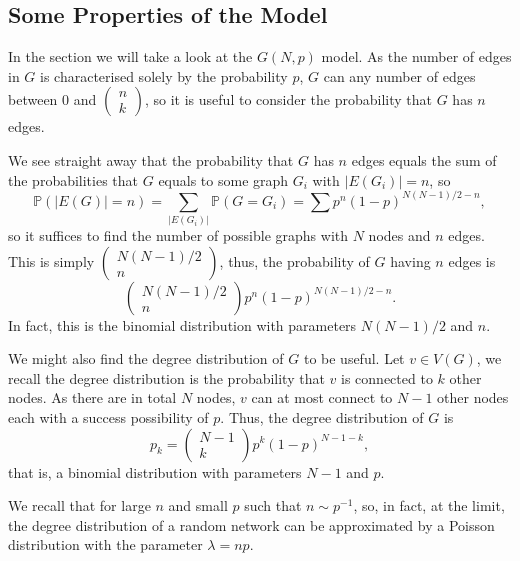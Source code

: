 \documentclass[
]{article}
\theoremstyle{definition}
\theoremstyle{definition}
\begin{document}
\hypertarget{some-properties-of-the-model}{%
\subsection{Some Properties of the
Model}\label{some-properties-of-the-model}}

In the section we will take a look at the \(G(N, p)\) model. As the
number of edges in \(G\) is characterised solely by the probability
\(p\), \(G\) can any number of edges between 0 and
\(\begin{pmatrix} n \\ k \end{pmatrix}\), so it is useful to consider
the probability that \(G\) has \(n\) edges.

We see straight away that the probability that \(G\) has \(n\) edges
equals the sum of the probabilities that \(G\) equals to some graph
\(G_i\) with \(\left| E(G_i) \right| = n\), so
\[\mathbb{P}(\left| E(G) \right| = n) = \sum_{\left| E(G_i) \right|}\mathbb{P}(G = G_i)
  = \sum p^n (1 - p)^{N (N - 1) / 2 - n},\] so it suffices to find the
number of possible graphs with \(N\) nodes and \(n\) edges. This is
simply \(\begin{pmatrix} N (N - 1) / 2 \\ n \end{pmatrix}\), thus, the
probability of \(G\) having \(n\) edges is
\[\begin{pmatrix} N (N - 1) / 2 \\ n \end{pmatrix}p^n (1 - p)^{N (N - 1) / 2 - n}.\]
In fact, this is the binomial distribution with parameters
\(N (N - 1) / 2\) and \(n\).

We might also find the degree distribution of \(G\) to be useful. Let
\(v \in V(G)\), we recall the degree distribution is the probability
that \(v\) is connected to \(k\) other nodes. As there are in total
\(N\) nodes, \(v\) can at most connect to \(N - 1\) other nodes each
with a success possibility of \(p\). Thus, the degree distribution of
\(G\) is
\[p_k = \begin{pmatrix} N - 1 \\ k \end{pmatrix} p^k (1 - p)^{N - 1 - k}, \]
that is, a binomial distribution with parameters \(N - 1\) and \(p\).

We recall that for large \(n\) and small \(p\) such that
\(n \sim p^{-1}\), so, in fact, at the limit, the degree distribution of
a random network can be approximated by a Poisson distribution with the
parameter \(\lambda = np\).
\end{document}
